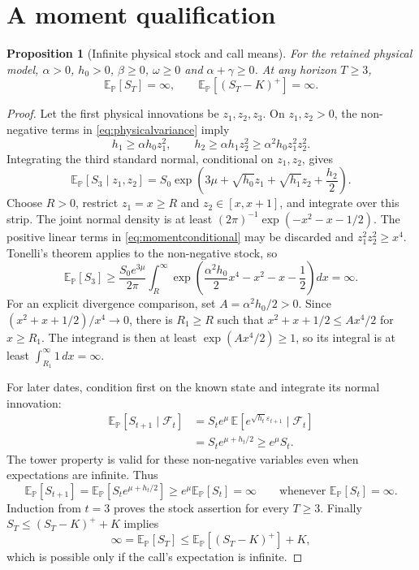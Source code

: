 \documentclass[11pt,a4paper]{article}
\newcommand{\E}{\mathbb E}
\newcommand{\Pp}{\mathbb P}
\newcommand{\F}{\mathcal F}
\newtheorem{proposition}{Proposition}
\theoremstyle{remark}
\begin{document}
\section{A moment qualification}\label{sec:moments}
\begin{proposition}[Infinite physical stock and call means]
For the retained physical model, $\alpha>0$, $h_0>0$, $\beta\geq0$, $\omega\geq0$ and $\alpha+\gamma\geq0$. At any horizon $T\geq3$,
\begin{equation}
 \E_{\Pp}[S_T]=\infty,\qquad\E_{\Pp}[(S_T-K)^+]=\infty.
\end{equation}
\end{proposition}
\begin{proof}
Let the first physical innovations be $z_1,z_2,z_3$. On $z_1,z_2>0$, the non-negative terms in \eqref{eq:physicalvariance} imply
\begin{equation}
 h_1\geq\alpha h_0z_1^2,\qquad
 h_2\geq\alpha h_1z_2^2\geq\alpha^2h_0z_1^2z_2^2.
\end{equation}
Integrating the third standard normal, conditional on $z_1,z_2$, gives
\begin{equation}
 \E_{\Pp}[S_3\mid z_1,z_2]
 =S_0\exp\!\left(3\mu+\sqrt{h_0}z_1+\sqrt{h_1}z_2+\frac{h_2}{2}\right).
 \label{eq:momentconditional}
\end{equation}
Choose $R>0$, restrict $z_1=x\geq R$ and $z_2\in[x,x+1]$, and integrate over this strip. The joint normal density is at least $(2\pi)^{-1}\exp(-x^2-x-1/2)$. The positive linear terms in \eqref{eq:momentconditional} may be discarded and $z_1^2z_2^2\geq x^4$. Tonelli's theorem applies to the non-negative stock, so
\begin{equation}
 \E_{\Pp}[S_3]\geq\frac{S_0e^{3\mu}}{2\pi}
       \int_R^\infty\exp\!\left(\frac{\alpha^2h_0}{2}x^4-x^2-x-\frac12\right)dx
       =\infty.
\end{equation}
For an explicit divergence comparison, set $A=\alpha^2h_0/2>0$. Since
$(x^2+x+1/2)/x^4\longrightarrow0$, there is $R_1\geq R$ such that
$x^2+x+1/2\leq Ax^4/2$ for $x\geq R_1$. The integrand is then at least
$\exp(Ax^4/2)\geq1$, so its integral is at least
$\int_{R_1}^{\infty}1\,dx=\infty$.

For later dates, condition first on the known state and integrate its normal innovation:
\begin{align}
 \E_{\Pp}[S_{t+1}\mid\F_t]
 &=S_t e^\mu\,\E[e^{\sqrt{h_t}\varepsilon_{t+1}}\mid\F_t]\nonumber\\
 &=S_t e^{\mu+h_t/2}\geq e^\mu S_t.
\end{align}
The tower property is valid for these non-negative variables even when expectations are infinite. Thus
\begin{equation}
 \E_{\Pp}[S_{t+1}]
 =\E_{\Pp}[S_t e^{\mu+h_t/2}]
 \geq e^\mu\E_{\Pp}[S_t]=\infty
 \qquad\text{whenever }\E_{\Pp}[S_t]=\infty.
\end{equation}
Induction from $t=3$ proves the stock assertion for every $T\geq3$. Finally
$S_T\leq(S_T-K)^++K$ implies
\begin{equation}
 \infty=\E_{\Pp}[S_T]\leq\E_{\Pp}[(S_T-K)^+]+K,
\end{equation}
which is possible only if the call's expectation is infinite.
\end{proof}
\end{document}
